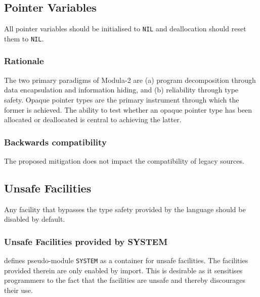 \documentclass[10pt,a4paper]{article}
\begin{document}
\subsection{Pointer Variables}
All pointer variables should be initialised to \verb|NIL| and deallocation
should reset them to \verb|NIL|.

\subsubsection{Rationale}
The two primary paradigms of Modula-2 are (a) program decomposition through
data encapsulation and information hiding, and (b) reliability through type
safety. Opaque pointer types are the primary instrument through which the
former is achieved. The ability to test whether an opaque pointer type has
been allocated or deallocated is central to achieving the latter.

\subsubsection{Backwards compatibility}

The proposed mitigation does not impact the compatibility of legacy sources.


\subsection{Unsafe Facilities}

Any facility that bypasses the type safety provided by the language should be
disabled by default.

\subsubsection{Unsafe Facilities provided by SYSTEM}
\cite[p.121]{Wirth88} defines pseudo-module \verb|SYSTEM| as a container for
unsafe facilities. The facilities provided therein are only enabled by import.
This is desirable as it sensitises programmers to the fact that the facilities
are unsafe and thereby discourages their use.
 
\end{document}
